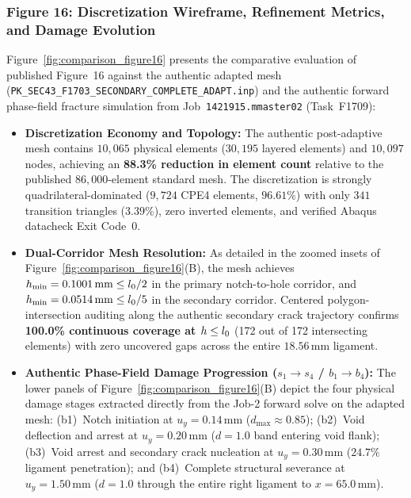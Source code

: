 \subsubsection{Figure 16: Discretization Wireframe, Refinement Metrics, and Damage Evolution}
Figure~\ref{fig:comparison_figure16} presents the comparative evaluation of published Figure~16 against the authentic adapted mesh (\texttt{PK\_SEC43\_F1703\_SECONDARY\_COMPLETE\_ADAPT.inp}) and the authentic forward phase-field fracture simulation from Job~\texttt{1421915.mmaster02} (Task~F1709):
\begin{itemize}
  \item \textbf{Discretization Economy and Topology:} The authentic post-adaptive mesh contains $10{,}065$ physical elements ($30{,}195$ layered elements) and $10{,}097$ nodes, achieving an \textbf{88.3\% reduction in element count} relative to the published $86{,}000$-element standard mesh. The discretization is strongly quadrilateral-dominated ($9{,}724$ CPE4 elements, $96.61\%$) with only $341$ transition triangles ($3.39\%$), zero inverted elements, and verified Abaqus datacheck Exit Code~0.
  \item \textbf{Dual-Corridor Mesh Resolution:} As detailed in the zoomed insets of Figure~\ref{fig:comparison_figure16}(B), the mesh achieves $h_{\min} = 0.1001\,\mathrm{mm} \le l_0/2$ in the primary notch-to-hole corridor, and $h_{\min} = 0.0514\,\mathrm{mm} \le l_0/5$ in the secondary corridor. Centered polygon-intersection auditing along the authentic secondary crack trajectory confirms \textbf{100.0\% continuous coverage at $h \le l_0$} (172 out of 172 intersecting elements) with zero uncovered gaps across the entire $18.56\,\mathrm{mm}$ ligament.
  \item \textbf{Authentic Phase-Field Damage Progression ($s_1 \to s_4$ / $b_1 \to b_4$):} The lower panels of Figure~\ref{fig:comparison_figure16}(B) depict the four physical damage stages extracted directly from the Job-2 forward solve on the adapted mesh: (b1)~Notch initiation at $u_y = 0.14\,\mathrm{mm}$ ($d_{\max} \approx 0.85$); (b2)~Void deflection and arrest at $u_y = 0.20\,\mathrm{mm}$ ($d = 1.0$ band entering void flank); (b3)~Void arrest and secondary crack nucleation at $u_y = 0.30\,\mathrm{mm}$ ($24.7\%$ ligament penetration); and (b4)~Complete structural severance at $u_y = 1.50\,\mathrm{mm}$ ($d = 1.0$ through the entire right ligament to $x = 65.0\,\mathrm{mm}$).

\end{itemize}
